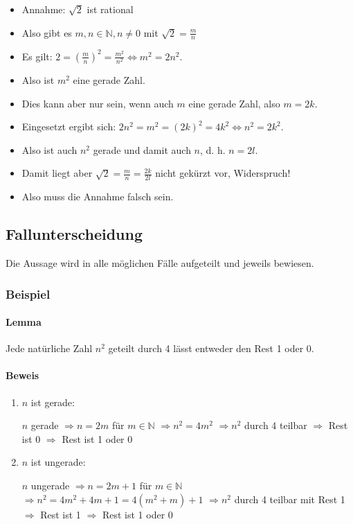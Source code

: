 \documentclass[10pt,a4paper,twoside,twocolumn]{article}
\begin{document}
	\begin{itemize}
		\setlength\itemsep{0em}
		\item Annahme: $ \sqrt{2} $ ist rational
		\item Also gibt es $ m, n \in \mathbb{N}, n \neq 0 $ mit $ \sqrt{2} = \frac{m}{n} $
		\item Es gilt: $ 2 = (\frac{m}{n})^2 = \frac{m^2}{n^2} \Leftrightarrow m^2 = 2n^2 $.
		\item Also ist $ m^2 $ eine gerade Zahl.
		\item Dies kann aber nur sein, wenn auch $ m $ eine gerade Zahl, also $ m = 2k $.
		\item Eingesetzt ergibt sich: $ 2n^2 = m^2 = (2k)^2 = 4k^2 \Leftrightarrow n^2 = 2k^2 $.
		\item Also ist auch $ n^2 $ gerade und damit auch $ n $, d. h. $ n = 2l $.
		\item Damit liegt aber $ \sqrt{2} = \frac{m}{n} = \frac{2k}{2l} $ nicht gekürzt vor, Widerspruch!
		\item Also muss die Annahme falsch sein.
	\end{itemize}

	\subsection{Fallunterscheidung}
	
	Die Aussage wird in alle möglichen Fälle aufgeteilt und jeweils bewiesen.
	
	\subsubsection{Beispiel}
	
	\paragraph{Lemma} Jede natürliche Zahl $ n^2 $ geteilt durch 4 lässt entweder den Rest 1 oder 0.
	
	\paragraph{Beweis}
	
	\begin{enumerate}
		\item $ n $ ist gerade:
		
		$ n $ gerade $ \Rightarrow n = 2m $ für $ m \in \mathbb{N} $ 
		$ \Rightarrow n^2 = 4m^2 $
		$ \Rightarrow n^2 $ durch 4 teilbar
		$ \Rightarrow $ Rest ist 0
		$ \Rightarrow $ Rest ist 1 oder 0
		
		\item $ n $ ist ungerade:
		
		$ n $ ungerade $ \Rightarrow n = 2m + 1 $ für $ m \in \mathbb{N} $ 
		$ \Rightarrow n^2 = 4m^2 + 4m + 1 = 4(m^2 + m) + 1 $
		$ \Rightarrow n^2 $ durch 4 teilbar mit Rest 1
		$ \Rightarrow $ Rest ist 1
		$ \Rightarrow $ Rest ist 1 oder 0
	\end{enumerate}
\end{document}

